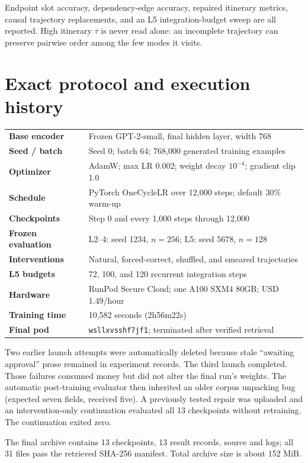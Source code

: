 \documentclass[10pt]{article}
\begin{document}
Endpoint slot accuracy, dependency-edge accuracy, repaired itinerary metrics,
causal trajectory replacements, and an L5 integration-budget sweep are all
reported. High itinerary $\tau$ is never read alone: an incomplete trajectory
can preserve pairwise order among the few modes it visits.

\section{Exact protocol and execution history}
\begin{tabularx}{\linewidth}{>{\bfseries}l X}
\toprule
Base encoder & Frozen GPT-2-small, final hidden layer, width 768 \\
Seed / batch & Seed 0; batch 64; 768,000 generated training examples \\
Optimizer & AdamW; max LR 0.002; weight decay $10^{-4}$; gradient clip 1.0 \\
Schedule & PyTorch OneCycleLR over 12,000 steps; default 30\% warm-up \\
Checkpoints & Step 0 and every 1,000 steps through 12,000 \\
Frozen evaluation & L2--4: seed 1234, $n=256$; L5: seed 5678, $n=128$ \\
Interventions & Natural, forced-correct, shuffled, and smeared trajectories \\
L5 budgets & 72, 100, and 120 recurrent integration steps \\
Hardware & RunPod Secure Cloud; one A100 SXM4 80GB; USD 1.49/hour \\
Training time & 10,582 seconds (2h56m22s) \\
Final pod & \texttt{wsllxvsshf7jf1}; terminated after verified retrieval \\
\bottomrule
\end{tabularx}

Two earlier launch attempts were automatically deleted because stale
``awaiting approval'' prose remained in experiment records. The third launch
completed. Those failures consumed money but did not alter the final run's
weights. The automatic post-training evaluator then inherited an older corpus
unpacking bug (expected seven fields, received five). A previously tested
repair was uploaded and an intervention-only continuation evaluated all 13
checkpoints without retraining. The continuation exited zero.

The final archive contains 13 checkpoints, 13 result records, source and logs;
all 31 files pass the retrieved SHA-256 manifest. Total archive size is about
152 MiB.
\end{document}
